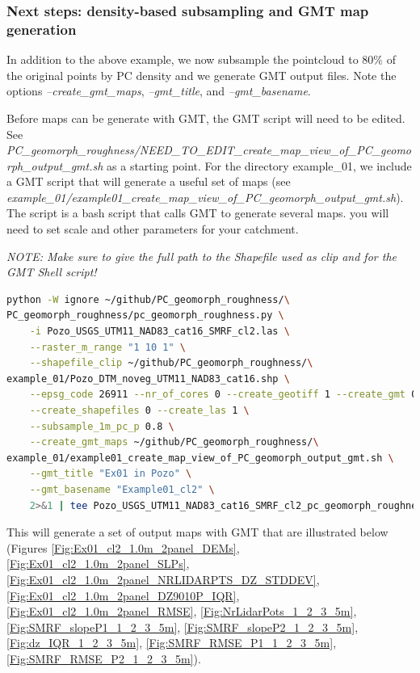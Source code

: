 \documentclass[a4paperpaper,,tablecaptionabove]{scrartcl}
\begin{document}
\hypertarget{next-steps-density-based-subsampling-and-gmt-map-generation}{%
\subsubsection{Next steps: density-based subsampling and GMT map
generation}\label{next-steps-density-based-subsampling-and-gmt-map-generation}}

In addition to the above example, we now subsample the pointcloud to
80\% of the original points by PC density and we generate GMT output
files. Note the options \emph{--create\_gmt\_maps}, \emph{--gmt\_title},
and \emph{--gmt\_basename}.

Before maps can be generate with GMT, the GMT script will need to be
edited. See
\emph{PC\_geomorph\_roughness/NEED\_TO\_EDIT\_create\_map\_view\_of\_PC\_geomorph\_output\_gmt.sh}
as a starting point. For the directory example\_01, we include a GMT
script that will generate a useful set of maps (see
\emph{example\_01/example01\_create\_map\_view\_of\_PC\_geomorph\_output\_gmt.sh}).
The script is a bash script that calls GMT to generate several maps. you
will need to set scale and other parameters for your catchment.

\emph{NOTE: Make sure to give the full path to the Shapefile used as
clip and for the GMT Shell script!}

\begin{lstlisting}[language=bash]
python -W ignore ~/github/PC_geomorph_roughness/\
PC_geomorph_roughness/pc_geomorph_roughness.py \
    -i Pozo_USGS_UTM11_NAD83_cat16_SMRF_cl2.las \
    --raster_m_range "1 10 1" \
    --shapefile_clip ~/github/PC_geomorph_roughness/\
example_01/Pozo_DTM_noveg_UTM11_NAD83_cat16.shp \
    --epsg_code 26911 --nr_of_cores 0 --create_geotiff 1 --create_gmt 0  \
    --create_shapefiles 0 --create_las 1 \
    --subsample_1m_pc_p 0.8 \
    --create_gmt_maps ~/github/PC_geomorph_roughness/\
example_01/example01_create_map_view_of_PC_geomorph_output_gmt.sh \
    --gmt_title "Ex01 in Pozo" \
    --gmt_basename "Example01_cl2" \
    2>&1 | tee Pozo_USGS_UTM11_NAD83_cat16_SMRF_cl2_pc_geomorph_roughness_subsample_p08_1_10_1.log
\end{lstlisting}

This will generate a set of output maps with GMT that are illustrated
below (Figures \ref{Fig:Ex01_cl2_1.0m_2panel_DEMs},
\ref{Fig:Ex01_cl2_1.0m_2panel_SLPs},
\ref{Fig:Ex01_cl2_1.0m_2panel_NRLIDARPTS_DZ_STDDEV},
\ref{Fig:Ex01_cl2_1.0m_2panel_DZ9010P_IQR},
\ref{Fig:Ex01_cl2_1.0m_2panel_RMSE}, \ref{Fig:NrLidarPots_1_2_3_5m},
\ref{Fig:SMRF_slopeP1_1_2_3_5m},
\ref{Fig:SMRF_slopeP2_1_2_3_5m},\ref{Fig:dz_IQR_1_2_3_5m},
\ref{Fig:SMRF_RMSE_P1_1_2_3_5m}, \ref{Fig:SMRF_RMSE_P2_1_2_3_5m}).
\end{document}
